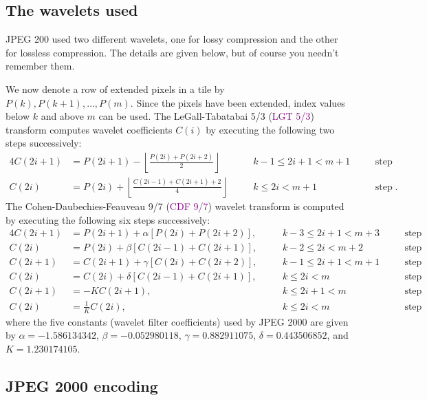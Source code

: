\documentclass[a4paper, 11pt, openany]{book}
\numberwithin{equation}{section}
\theoremstyle{plain}
\theoremstyle{definition}
\newcommand{\Define}[1]{\textcolor{purple}{#1}}
\begin{document}
\subsection{The wavelets used}

JPEG 200 used two different wavelets, one for lossy compression and the other for lossless compression. The details are given below, but of course you needn't remember them.

We now denote a row of extended pixels in a tile by $P(k), P(k+1), \dots , P(m)$. Since the pixels have been extended, index values below $k$ and above $m$ can be used. The LeGall-Tabatabai 5/3 (\Define{LGT 5/3}) transform computes wavelet coefficients $C(i)$ by executing the following two steps successively:
\begin{alignat*}{4}
    C(2i + 1) &= P(2i + 1) - \left\lfloor \frac{P(2i) + P(2i + 2)}{2} \right\rfloor &\quad& k - 1 \le 2i + 1 < m+ 1 &\quad& \text{step 1}\\
    C(2i) &= P(2i) + \left\lfloor \frac{ C(2i - 1) + C(2i + 1) + 2 }{4} \right\rfloor &\quad&  k \le 2i < m+ 1 &\quad& \text{step 2}.
\end{alignat*}
The Cohen-Daubechies-Feauveau 9/7 (\Define{CDF 9/7}) wavelet transform is computed by executing the following six steps successively:
\begin{alignat*}{4}
C(2i + 1) &= P(2i + 1) +  \alpha [P(2i) + P(2i + 2)], &\quad & k-3 \le 2i+1 < m+3 & \quad& \text{step 1}\\
C(2i) &= P(2i) + \beta[C(2i - 1) + C(2i + 1)], &\quad& k-2 \le 2i < m+2 &\quad& \text{step 2}\\
C(2i + 1) &= C(2i + 1) + \gamma[C(2i) + C(2i + 2)], &\quad& k-1 \le 2i+1 < m+1 &\quad& \text{step 3}\\
C(2i) &= C(2i) + \delta[C(2i - 1) + C(2i + 1)], &\quad& k \le 2i < m &\quad& \text{step 4}\\
C(2i + 1) &= -K C(2i + 1), &\quad& k \le 2i + 1 < m &\quad& \text{step 5}\\
C(2i) &=  \frac{1}{K} C(2i), &\quad& k \le 2i < m &\quad& \text{step 6}
\end{alignat*}
where the five constants (wavelet filter coefficients) used by JPEG 2000 are given by
$\alpha = -1.586134342$, $\beta = -0.052980118$, $\gamma = 0.882911075$, $\delta = 0.443506852$, and $K = 1.230174105$.



\subsection{JPEG 2000 encoding}
\end{document}
